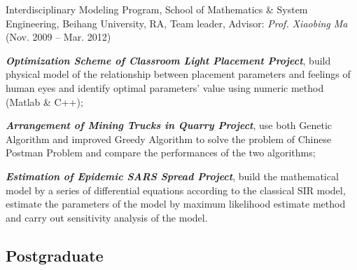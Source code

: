 \documentclass[10pt,letterpaper]{article}
\renewenvironment{itemize}{
  \begin{list}{}{
    \setlength{\leftmargin}{1.5em}
    \setlength{\itemsep}{0.25em}
    \setlength{\parskip}{0pt}
    \setlength{\parsep}{0.25em}
  }
}{
  \end{list}
}
\begin{document}
\begin{itemize}
  \item Interdisciplinary Modeling Program, School of Mathematics \& System Engineering, Beihang University, RA, Team leader, Advisor: \textit{Prof. Xiaobing Ma} (Nov. 2009 -- Mar. 2012)
  \begin{itemize}
    \item \textbf{\textit{Optimization Scheme of Classroom Light Placement Project}}, build physical model of the relationship between placement parameters and feelings of human eyes and identify optimal parameters' value using numeric method (Matlab \& C++);
    \item \textit{\textbf{Arrangement of Mining Trucks in Quarry Project}}, use both Genetic Algorithm and improved Greedy Algorithm to solve the problem of Chinese Postman Problem and compare the performances of the two algorithms;
    \item \textbf{\textit{Estimation of Epidemic SARS Spread Project}}, build the mathematical model by a series of differential equations according to the classical SIR model, estimate the parameters of the model by maximum likelihood estimate method and carry out sensitivity analysis of the model.
  \end{itemize}
\end{itemize}

\subsection*{Postgraduate}
\end{document}
